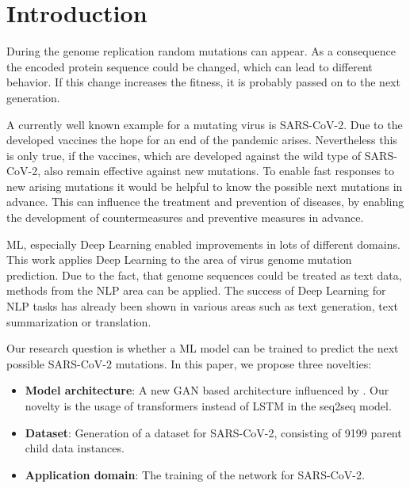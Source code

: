 \section{Introduction}  \label{introduction}


During the genome replication random mutations can appear. As a con\-se\-quence the encoded protein sequence could be changed, which can lead to different behavior. If this change increases the fitness, it is probably passed on to the next generation. \cite{Berman2020}

A currently well known example for a mutating virus is \ac{SARS-CoV-2}. Due to the developed vaccines the hope for an end of the pandemic arises. Nevertheless this is only true, if the vaccines, which are developed against the wild type of \ac{SARS-CoV-2}, also remain effective against new mutations. To enable fast responses to new arising mutations it would be helpful to know the possible next mutations in advance. This can influence the treatment and prevention of diseases, by enabling the development of countermeasures and preventive measures in advance. \cite{Berman2020}

\ac{ML}, especially Deep Learning enabled improvements in lots of different domains. This work applies Deep Learning to the area of virus genome mutation prediction. Due to the fact, that genome sequences could be treated as text data, methods from the \ac{NLP} area can be applied. The success of Deep Learning for \ac{NLP} tasks has already been shown in various areas such as text generation, text sum\-ma\-riza\-t\-ion or translation. \cite{Berman2020}

Our research question is whether a \ac{ML} model can be trained to predict the next possible \ac{SARS-CoV-2} mutations. In this paper, we propose three novelties:
\begin{itemize}
	\item \textbf{Model architecture}: A new \ac{GAN} based architecture influenced by \cite{Berman2020}. Our novelty is the usage of trans\-for\-mers instead of \ac{LSTM} in the seq2seq model.
	\item \textbf{Dataset}: Generation of a dataset for \ac{SARS-CoV-2}, consisting of 9199 parent child data instances. %
	\item \textbf{Application domain}: The training of the network for \ac{SARS-CoV-2}.
\end{itemize}

\newpage
